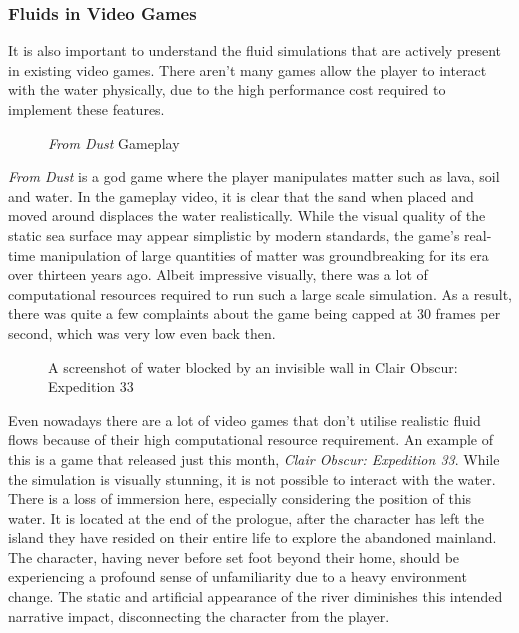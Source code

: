 \documentclass[a4paper, 12pt]{article}
\newcommand{\wideimage}[2][]{%
  \makebox[\textwidth][c]{\texttt{[image: \#2]}}%
}
\begin{document}
    \subsubsection{Fluids in Video Games}

    It is also important to understand the fluid simulations that are actively present in existing video games. There aren't many games allow the player to interact with the water physically, due to the high performance cost required to implement these features.

    \begin{figure}[H]
        \wideimage[]{fromDust.png}
        \caption{\textit{From Dust} Gameplay \cite{fromdustvideo}}
    \end{figure}

    \textit{From Dust}\cite{fromdust} is a god game where the player manipulates matter such as lava, soil and water. In the gameplay video\cite{fromdustvideo}, it is clear that the sand when placed and moved around displaces the water realistically. While the visual quality of the static sea surface may appear simplistic by modern standards, the game's real-time manipulation of large quantities of matter was groundbreaking for its era over thirteen years ago. Albeit impressive visually, there was a lot of computational resources required to run such a large scale simulation. As a result, there was quite a few complaints about the game being capped at 30 frames per second\cite{dsog}, which was very low even back then.
    
    \begin{figure}[H]
        \wideimage[]{clairObscur.png}
        \caption{A screenshot of water blocked by an invisible wall in Clair Obscur: Expedition 33}
    \end{figure}

    Even nowadays there are a lot of video games that don't utilise realistic fluid flows because of their high computational resource requirement. An example of this is a game that released just this month, \textit{Clair Obscur: Expedition 33}\cite{clairobscur}.
    While the simulation is visually stunning, it is not possible to interact with the water. There is a loss of immersion here, especially considering the position of this water. It is located at the end of the prologue, after the character has left the island they have resided on their entire life to explore the abandoned mainland. The character, having never before set foot beyond their home, should be experiencing a profound sense of unfamiliarity due to a heavy environment change. The static and artificial appearance of the river diminishes this intended narrative impact, disconnecting the character from the player.
\end{document}
